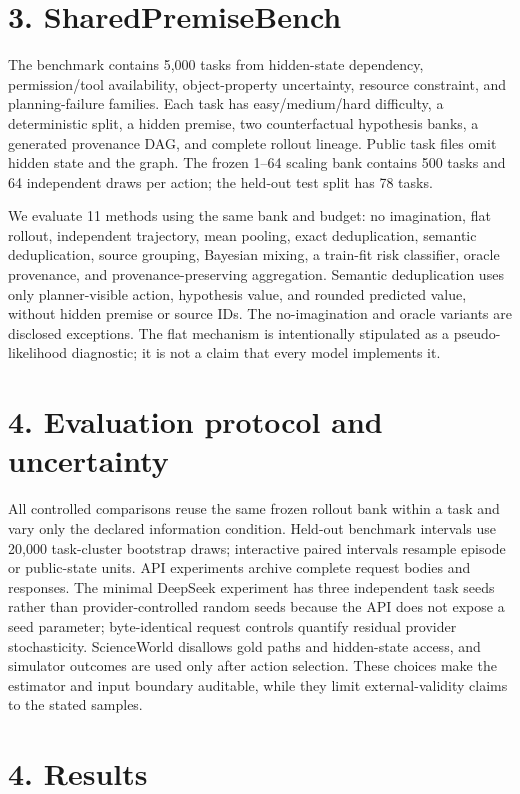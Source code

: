\documentclass[10pt]{article}
\begin{document}
\section{3. SharedPremiseBench}

The benchmark contains 5,000 tasks from hidden-state dependency, permission/tool availability, object-property uncertainty, resource constraint, and planning-failure families. Each task has easy/medium/hard difficulty, a deterministic split, a hidden premise, two counterfactual hypothesis banks, a generated provenance DAG, and complete rollout lineage. Public task files omit hidden state and the graph. The frozen 1--64 scaling bank contains 500 tasks and 64 independent draws per action; the held-out test split has 78 tasks.

We evaluate 11 methods using the same bank and budget: no imagination, flat rollout, independent trajectory, mean pooling, exact deduplication, semantic deduplication, source grouping, Bayesian mixing, a train-fit risk classifier, oracle provenance, and provenance-preserving aggregation. Semantic deduplication uses only planner-visible action, hypothesis value, and rounded predicted value, without hidden premise or source IDs. The no-imagination and oracle variants are disclosed exceptions. The flat mechanism is intentionally stipulated as a pseudo-likelihood diagnostic; it is not a claim that every model implements it.

\section{4. Evaluation protocol and uncertainty}

All controlled comparisons reuse the same frozen rollout bank within a task and vary only the declared information condition. Held-out benchmark intervals use 20,000 task-cluster bootstrap draws; interactive paired intervals resample episode or public-state units. API experiments archive complete request bodies and responses. The minimal DeepSeek experiment has three independent task seeds rather than provider-controlled random seeds because the API does not expose a seed parameter; byte-identical request controls quantify residual provider stochasticity. ScienceWorld disallows gold paths and hidden-state access, and simulator outcomes are used only after action selection. These choices make the estimator and input boundary auditable, while they limit external-validity claims to the stated samples.

\section{4. Results}
\end{document}
